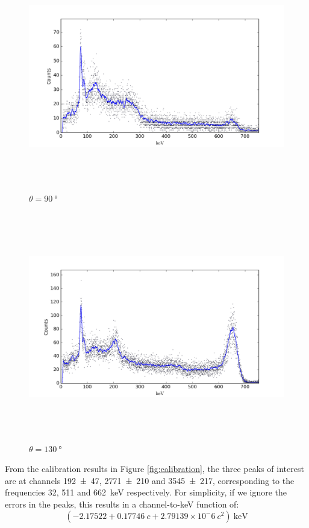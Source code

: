 \documentclass[a4paper]{scrartcl}
\begin{document}
\begin{figure}
    \centering
    \includegraphics[height = 10cm]{data/90.png}
    \caption{\(\theta = \SI{90}{\degree}\)}
    \label{fig:90}
\end{figure}
\begin{figure}
    \centering
    \includegraphics[height = 10cm]{data/130.png}
    \caption{\(\theta = \SI{130}{\degree}\)}
    \label{fig:130}
\end{figure}

From the calibration results in Figure \ref{fig:calibration}, the three peaks of interest are at channels \SI{192 \pm 47}{}, \SI{2771 \pm 210}{} and \SI{3545 \pm 217}{}, corresponding to the frequencies 32, 511 and \SI{662}{\kilo\electronvolt} respectively. For simplicity, if we ignore the errors in the peaks, this results in a channel-to-keV function of:
\[(-2.17522 + 0.17746 \:c + 2.79139 \times 10^-6 \:c^2) \:\si{\kilo\electronvolt}\]
\end{document}
